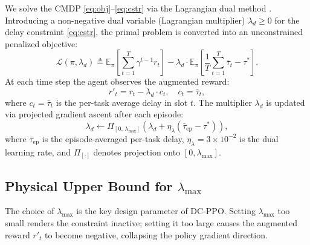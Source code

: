 \documentclass[journal]{IEEEtran}
\newcommand{\ld}{\lambda_d}
\begin{document}
We solve the CMDP \eqref{eq:obj}--\eqref{eq:cstr} via the
Lagrangian dual method \cite{altman1999cmdp,tessler2019rcpo}.
Introducing a non-negative dual variable (Lagrangian multiplier)
$\ld \ge 0$ for the delay constraint \eqref{eq:cstr}, the
primal problem is converted into an unconstrained penalized
objective:
\begin{equation}
  \mathcal{L}(\pi, \ld) \triangleq
  \mathbb{E}_\pi\!\left[\sum_{t=1}^T \gamma^{t-1} r_t\right]
  - \ld \cdot \mathbb{E}_\pi\!\left[
      \frac{1}{T}\sum_{t=1}^T \bar{\tau}_t - \tau^*
    \right].
  \label{eq:lagrangian}
\end{equation}
At each time step the agent observes the augmented reward:
\begin{equation}
  r'_t = r_t - \ld \cdot c_t, \quad c_t = \bar{\tau}_t,
  \label{eq:aug_reward}
\end{equation}
where $c_t = \bar{\tau}_t$ is the per-task average delay in slot $t$.
The multiplier $\ld$ is updated via projected gradient ascent
after each episode:
\begin{equation}
  \ld \leftarrow \Pi_{[0,\,\lambda_{\max}]}\!\left(
    \ld + \eta_\lambda \left(\bar{\tau}_{\text{ep}} - \tau^*\right)
  \right),
  \label{eq:lambda_update}
\end{equation}
where $\bar{\tau}_{\text{ep}}$ is the episode-averaged per-task delay,
$\eta_\lambda = 3\times10^{-2}$ is the dual learning rate, and
$\Pi_{[\cdot]}$ denotes projection onto $[0, \lambda_{\max}]$.

\subsection{Physical Upper Bound for $\lambda_{\max}$}

The choice of $\lambda_{\max}$ is the key design parameter of DC-PPO.
Setting $\lambda_{\max}$ too small renders the constraint inactive;
setting it too large causes the augmented reward $r'_t$ to become
negative, collapsing the policy gradient direction.
\end{document}
